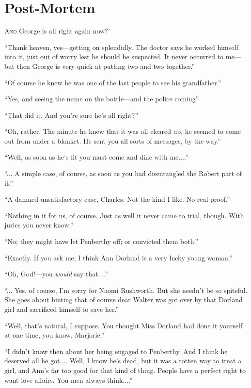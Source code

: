 \chapter{Post-Mortem}

\lettrine[lines=4,ante=‘]{A}{nd} George is all right again now?'

\zz
\enquote{Thank heaven, yes\allowbreak---\allowbreak getting on splendidly. The doctor says he worked himself into it, just out of worry lest he should be suspected. It never occurred to me\allowbreak---\allowbreak but then George is very quick at putting two and two together.}

\enquote{Of course he knew he was one of the last people to see his grandfather.}

\enquote{Yes, and seeing the name on the bottle\allowbreak---\allowbreak and the police coming\longdash}

\enquote{That did it. And you're sure he's all right?}

\enquote{Oh, rather. The minute he knew that it was all cleared up, he seemed to come out from under a blanket. He sent you all sorts of messages, by the way.}

\enquote{Well, as soon as he's fit you must come and dine with me....}

\enquote{... A simple case, of course, as soon as you had disentangled the Robert part of it.}

\enquote{A damned unsatisfactory case, Charles. Not the kind I like. No real proof.}

\enquote{Nothing in it for us, of course. Just as well it never came to trial, though. With juries you never know.}

\enquote{No; they might have let Penberthy off; or convicted them both.}

\enquote{Exactly. If you ask me, I think Ann Dorland is a very lucky young woman.}

\enquote{Oh, God!---you \textit{would} say that....}

\enquote{... Yes, of course, I'm sorry for Naomi Rushworth. But she needn't be so spiteful. She goes about hinting that of course dear Walter was got over by that Dorland girl and sacrificed himself to save her.}

\enquote{Well, that's natural, I suppose. You thought Miss Dorland had done it yourself at one time, you know, Marjorie.}

\enquote{I didn't know then about her being engaged to Penberthy. And I think he deserved all he got.... Well, I know he's dead, but it was a rotten way to treat a girl, and Ann's far too good for that kind of thing. People have a perfect right to want love-affairs. You men always think....}

